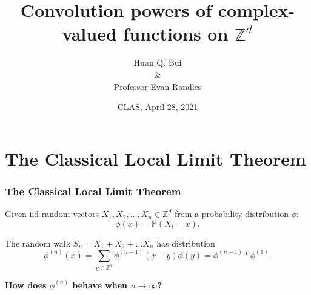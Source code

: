\documentclass{beamer}
\title[A generalized integration formula...]
{
	Convolution powers
	of complex-valued functions on $\mathbb{Z}^d$
}
\author[Bui \& Randles] %
{Huan Q. Bui \\
	\& \\
	Professor Evan Randles}
\institute[Colby College] %
{
}
\date{CLAS, April 28, 2021}
\theoremstyle{definition}
\begin{document}
 
\frame{\titlepage}




 



\section{The Classical Local Limit Theorem}
\begin{frame}
\frametitle{The Classical Local Limit Theorem}

Given iid random vectors $X_1, X_2, \dots, X_n \in \mathbb{Z}^d$ from a probability distribution $\phi$:
\begin{equation*}
\phi(x) = \mathbb{P}(X_i = x).
\end{equation*}




The random walk $S_n = X_1 + X_2 + \dots X_n$ has distribution
\begin{equation*}
\phi^{(n)}(x)=\sum_{y\in\mathbb{Z}^d}\phi^{(n-1)}(x-y)\phi(y) = \phi^{(n-1)}\ast \phi^{(1)}.
\end{equation*}

\textbf{How does $\phi^{(n)}$ behave when $n\to \infty$?}

\end{frame}
\end{document}
